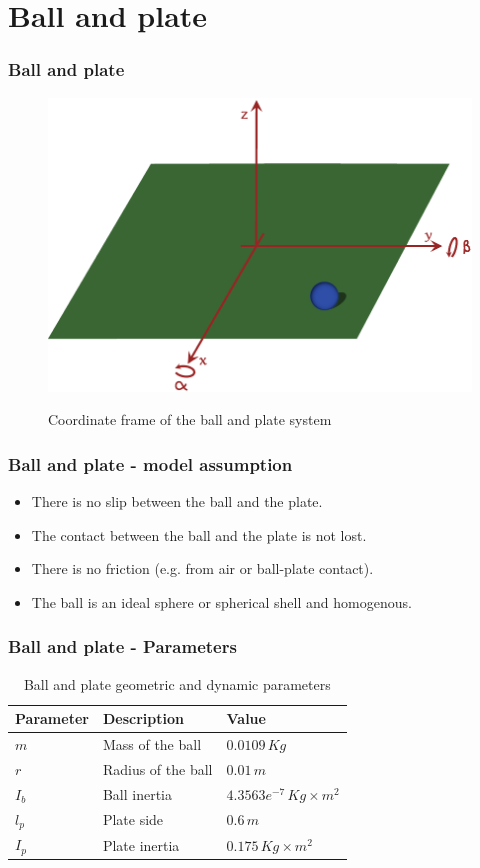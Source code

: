 %
\section{Ball and plate}
%
\begin{frame}
\frametitle{Ball and plate}
\begin{figure}
		{\includegraphics[width=.8\linewidth]{img/ballplate.pdf}}
		\caption{Coordinate frame of the ball and plate system}
		\label{fig:BallPlate}
\end{figure}
\end{frame}
%
\begin{frame}
	\frametitle{Ball and plate - model assumption}
	\begin{itemize}
    \item There is no slip between the ball and the plate.
 	\item The contact between the ball and the plate is not lost.
 	\item There is no friction (e.g. from air or ball-plate contact).
 	\item The ball is an ideal sphere or spherical shell and homogenous.
	\end{itemize}
\end{frame}
%
\begin{frame}
\frametitle{Ball and plate - Parameters}
\begin{table}
\begin{center}
\begin{tabu} to \textwidth { | X[c] | X[c] | X[c] | }
	\hline
	\textbf{Parameter} & \textbf{Description} & \textbf{Value} \\
	\hline
	$m$ & Mass of the ball & $0.0109 \, Kg$ \\
	$r$ & Radius of the ball & $0.01 \, m$ \\
	$I_b$ & Ball inertia & $4.3563e^{-7} \, Kg\times m^2$ \\
	$l_p$ & Plate side & $0.6 \, m$ \\
	$I_p$ & Plate inertia & $0.175 \, Kg\times m^2$ \\
	\hline
\end{tabu}
\caption{Ball and plate geometric and dynamic parameters}
\label{tab:BallPlate_param}
\end{center}
\end{table}
\end{frame}
%

